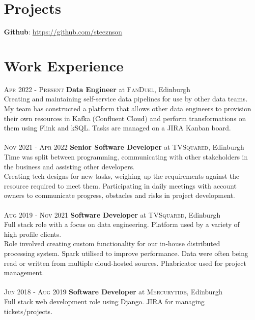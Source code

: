 \documentclass[14pt, a4paper]{extarticle}
\begin{document}
\begin{multicols}{2}
\section{Projects}
\noindent\textbf{Github}: \url{https://github.com/steeznson}

\columnbreak
\section{Work Experience}
\noindent\textsc{Apr 2022 - Present} \textbf{Data Engineer}
at \textsc{FanDuel}, Edinburgh\\
Creating and maintaining self-service data pipelines for use by other data teams. My team has constructed a platform that allows other data engineers to provision their own resources in Kafka (Confluent Cloud) and perform transformations on them using Flink and kSQL. Tasks are managed on a JIRA Kanban board.\\
\\
\noindent\textsc{Nov 2021 - Apr 2022} \textbf{Senior Software Developer}
at \textsc{TVSquared}, Edinburgh\\
Time was split between programming, communicating with other stakeholders in the business and assisting other developers.\\
Creating tech designs for new tasks, weighing up the requirements against the resource required to meet them. Participating in daily meetings with account owners to communicate progress, obstacles and risks in project development.\\
\\
\noindent\textsc{Aug 2019 - Nov 2021} \textbf{Software Developer}
at \textsc{TVSquared}, Edinburgh\\
Full stack role with a focus on data engineering. Platform used by a variety of high profile clients.\\
Role involved creating custom functionality for our in-house distributed processing system. Spark utilised to improve performance. Data were often being read or written from multiple cloud-hosted sources. Phabricator used for project management.\\
\\
\noindent\textsc{Jun 2018 - Aug 2019} \textbf{Software Developer}
at \textsc{Mercurytide}, Edinburgh\\
Full stack web development role using Django. JIRA for managing tickets/projects.\\
\end{multicols}
\end{document}
